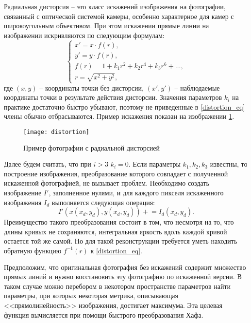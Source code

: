 
Радиальная дисторсия -- это класс искажений изображения на фотографии, связанный с оптической системой камеры, особенно характерное для камер с широкоугольным объективом. При этом искажении прямые линии на изображении искривляются по следующим формулам:
\begin{equation}
\label{distortion_eq}
    \begin{cases}
        x' = x \cdot f(r), \\
        y' = y \cdot f(r), \\
        f(r) = 1 + k_1 r^2 + k_2 r^4 + k_3 r^6 + \dots, \\
        r = \sqrt{x^2 + y^2},
    \end{cases}
\end{equation}
где $(x, y)$ -- координаты точки без дисторсии, $(x', y')$ -- наблюдаемые координаты точки в результате действия дисторсии. Значения параметров $k_i$ на практике достаточно быстро убывают, поэтому не приведенные в \eqref{distortion_eq} члены обычно отбрасываются. Пример искажения показан на изображении \ref{img:distortion}.

\begin{figure}[!h]
    \centering
    \texttt{[image: distortion]}
    \caption{Пример фотографии с радиальной дисторсией}
    \label{img:distortion}
\end{figure}

Далее будем считать, что при $i>3$ $k_i = 0$. Если параметры $k_1, k_2, k_3$ известны, то построение изображения, преобразование которого совпадает с полученной искаженной фотографией, не вызывает проблем. Необходимо создать изображение $I'$, заполненное нулями, и для каждого пикселя искаженного изображения $I_d$ выполняется следующая операция:
\begin{equation*}
    I'(x(x_d, y_d), y(x_d, y_d)) \mathrel{+}= I_d(x_d, y_d).
\end{equation*}
Преимущество такого преобразования состоит в том, что несмотря на то, что длины кривых не сохраняются, интегральная яркость вдоль каждой кривой остается той же самой. Но для такой реконструкции требуется уметь находить обратную функцию $f^{-1}(r)$ к \eqref{distortion_eq}.

Предположим, что оригинальная фотография без искажений содержит множество прямых линий и нужно восстановить эту фотографию по искаженной версии. В таком случае можно перебором в некотором пространстве параметров найти параметры, при которых некоторая метрика, описывающая <<прямолинейность>> изображения, достигает максимума. Эта целевая функция вычисляется при помощи быстрого преобразования Хафа.

